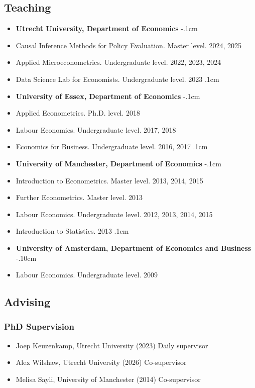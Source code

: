 \documentclass[11pt]{article}
\begin{document}
\subsection*{\sc Teaching}
\begin{itemize}[leftmargin=20pt]
    \itemsep0cm
    \item[-]\textbf{Utrecht University, Department of Economics}
    \itemsep-.1cm
    \item[] Causal Inference Methods for Policy Evaluation. Master level. 2024, 2025
    \item[] Applied Microeconometrics. Undergraduate level. 2022, 2023, 2024
    \item[] Data Science Lab for Economists. Undergraduate level. 2023 
    \itemsep.1cm
    \item[-]\textbf{University of Essex, Department of Economics}
    \itemsep-.1cm
    \item[] Applied Econometrics. Ph.D. level. 2018
    \item[] Labour Economics. Undergraduate level. 2017, 2018
    \item[] Economics for Business. Undergraduate level. 2016, 2017
    \itemsep.1cm
    \item[-]\textbf{University of Manchester, Department of Economics}
    \itemsep-.1cm
    \item[] Introduction to Econometrics. Master level. 2013, 2014, 2015
    \item[] Further Econometrics. Master level. 2013
    \item[] Labour Economics. Undergraduate level. 2012, 2013, 2014, 2015
    \item[] Introduction to Statistics. 2013
    \itemsep.1cm
    \item[-]\textbf{University of Amsterdam, Department of Economics and Business}
    \itemsep-.10cm
    \item[] Labour Economics. Undergraduate level. 2009

\end{itemize}

\subsection*{\sc Advising}
\subsubsection*{PhD Supervision}

\begin{itemize}[leftmargin=20pt]
    \itemsep-.1cm
    \item[] Joep Keuzenkamp, Utrecht University (2023\textendash) Daily supervisor
    \item[] Alex Wilshaw, Utrecht University (2026\textendash) Co-supervisor
    \item[] Melisa Sayli, University of Manchester (2014) Co-supervisor
\end{itemize}
\end{document}

